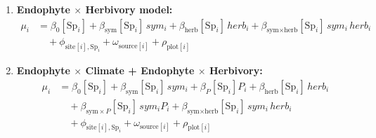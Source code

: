 \documentclass[12pt]{article}\usepackage[]{graphicx}\usepackage[dvipsnames]{xcolor}
\begin{document}
{\begin{enumerate}
    \item \textbf{Endophyte $\times$ Herbivory model:}
    \begin{align*}
    \mu_i &= \beta_0[\text{Sp}_i] + \beta_{\text{sym}}[\text{Sp}_i]\,sym_i
            + \beta_{\text{herb}}[\text{Sp}_i]\,herb_i
            + \beta_{\text{sym}\times \text{herb}}[\text{Sp}_i]\,sym_i\,herb_i \\
    &\quad + \phi_{\text{site}[i],\text{Sp}_i} + \omega_{\text{source}[i]} + \rho_{\text{plot}[i]}
    \end{align*}

    \item \textbf{Endophyte $\times$ Climate + Endophyte $\times$ Herbivory:}
    \begin{align*}
    \mu_i &= \beta_0[\text{Sp}_i] + \beta_{\text{sym}}[\text{Sp}_i]\,sym_i
            + \beta_P[\text{Sp}_i] P_i
            + \beta_{\text{herb}}[\text{Sp}_i]\,herb_i \\
    &\quad + \beta_{\text{sym}\times P}[\text{Sp}_i]\,sym_i P_i
            + \beta_{\text{sym}\times \text{herb}}[\text{Sp}_i]\,sym_i\,herb_i \\
    &\quad + \phi_{\text{site}[i],\text{Sp}_i} + \omega_{\text{source}[i]} + \rho_{\text{plot}[i]}
    \end{align*}


\end{enumerate}}
\end{document}
